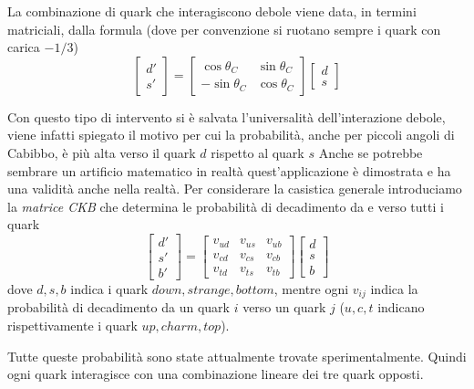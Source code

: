 La combinazione di quark che interagiscono debole viene data, in termini matriciali, dalla formula (dove per convenzione si ruotano sempre i quark con carica $-1/3$)
\begin{equation}
\begin{bmatrix}
d'\\s'
\end{bmatrix}
=\begin{bmatrix}
\cos\theta_C&\sin\theta_C\\
-\sin\theta_C&\cos\theta_C
\end{bmatrix}
\begin{bmatrix}
d\\s
\end{bmatrix}
\end{equation}


Con questo tipo di intervento si è salvata l'universalità dell'interazione debole, viene infatti spiegato il motivo per cui la probabilità, anche per piccoli angoli di Cabibbo, è più alta verso il quark $d$ rispetto al quark $s$
Anche se potrebbe sembrare un artificio matematico in realtà quest'applicazione è dimostrata e ha una validità anche nella realtà.
Per considerare la casistica generale introduciamo la \emph{matrice CKB} che determina le probabilità di decadimento da e verso tutti i quark
\begin{equation}
\begin{bmatrix}
d'\\s'\\b'
\end{bmatrix}
=\begin{bmatrix}
v_{ud}&v_{us}&v_{ub}\\
v_{cd}&v_{cs}&v_{cb}\\
v_{td}&v_{ts}&v_{tb}
\end{bmatrix}
\begin{bmatrix}
d\\s\\b
\end{bmatrix}
\end{equation}
dove $d, s, b$ indica i quark $down, strange, bottom$, mentre ogni $v_{ij}$ indica la probabilità di decadimento da un quark $i$ verso un quark $j$ ($u, c, t$ indicano rispettivamente i quark $up, charm, top$).
 
Tutte queste probabilità sono state attualmente trovate sperimentalmente.
Quindi ogni quark interagisce con una combinazione lineare dei tre quark opposti.

